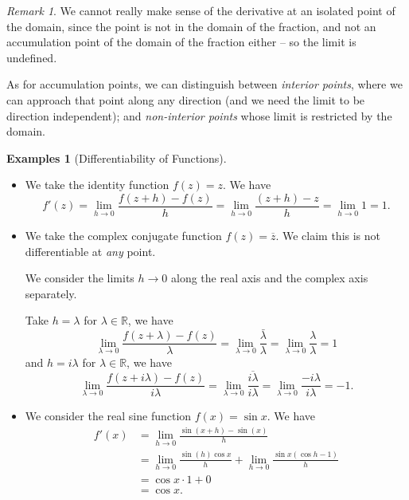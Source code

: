 \documentclass[11pt]{article}
\numberwithin{equation}{section}
\theoremstyle{definition}
\newtheorem{examples}[theorem]{Examples}
\theoremstyle{remark}
\newtheorem{remark}[theorem]{Remark}
\newcommand{\pqty}[1]{\left(#1\right)}
\newcommand{\RR}{\mathbb R}
\newcommand{\conjugate}[1]{\overline{#1}}
\begin{document}
\begin{remark}\label{analysis-unit-0102}
    We cannot really make sense of the derivative at an isolated point of the domain, since the point is not in the domain of the fraction, and not an accumulation point of the domain of the fraction either -- so the limit is undefined.

    As for accumulation points, we can distinguish between \emph{interior points}, where we can approach that point along any direction (and we need the limit to be direction independent); and \emph{non-interior points} whose limit is restricted by the domain.
\end{remark}

\begin{examples}[Differentiability of Functions]\label{analysis-unit-0103}
    \label{ex:differentiability}%
    \begin{itemize}
        \item We take the identity function \(f\pqty{z} = z\). We have
        \[
            f'\pqty{z} = \lim_{h \to 0} \frac{f\pqty{z + h} - f\pqty{z}}{h} = \lim_{h \to 0} \frac{\pqty{z + h} - z}{h} = \lim_{h \to 0} 1 = 1.
        \]

        \item We take the complex conjugate function \(f\pqty{z} = \conjugate{z}\). We claim this is not differentiable at \emph{any} point.
        
        We consider the limits \(h \to 0\) along the real axis and the complex axis separately.

        Take \(h = \lambda\) for \(\lambda \in \RR\), we have
        \[
            \lim_{\lambda \to 0} \frac{f\pqty{z + \lambda} - f\pqty{z}}{\lambda} = \lim_{\lambda \to 0} \frac{\bar{\lambda}}{\lambda} = \lim_{\lambda \to 0} \frac{\lambda}{\lambda} = 1
        \]
        and \(h = i \lambda\) for \(\lambda \in \RR\), we have
        \[
            \lim_{\lambda \to 0} \frac{f\pqty{z + i \lambda} - f\pqty{z}}{i\lambda} = \lim_{\lambda \to 0} \frac{\conjugate{i \lambda}}{i \lambda} = \lim_{\lambda \to 0} \frac{- i \lambda}{i \lambda} = -1.
        \]

        \item We consider the real sine function \(f\pqty{x} = \sin x\). We have
        \begin{align*}
            f'\pqty{x} &= \lim_{h \to 0} \frac{\sin \pqty{x + h} - \sin \pqty{x}}{h} \\
            &= \lim_{h \to 0} \frac{\sin \pqty{h} \cos x}{h} + \lim_{h \to 0} \frac{\sin x \pqty{\cos h - 1}}{h} \\
            &= \cos x \cdot 1 + 0 \\
            &= \cos x.
        \end{align*}
    \end{itemize}
\end{examples}
\end{document}

